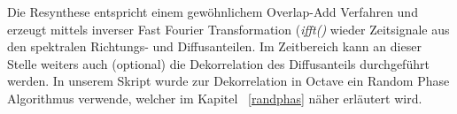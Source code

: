 Die Resynthese entspricht einem gewöhnlichem Overlap-Add Verfahren und erzeugt mittels inverser Fast Fourier Transformation (\textit{ifft()} wieder Zeitsignale aus den spektralen Richtungs- und Diffusanteilen. Im Zeitbereich kann an dieser Stelle weiters auch (optional) die Dekorrelation des Diffusanteils durchgeführt werden. In unserem Skript wurde zur Dekorrelation in Octave ein Random Phase Algorithmus verwende, welcher im Kapitel ~\ref{randphas} näher erläutert wird.